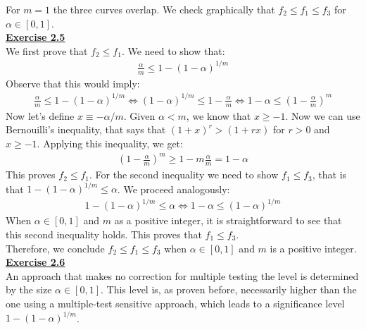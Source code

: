 \documentclass[a4paper, 11pt]{article}
\begin{document}
For $m=1$ the three curves overlap. We check graphically that $f_2 \leq f_1 \leq f_3$ for $\alpha \in [0,1]$.\\
\newline \textbf{\underline{Exercise 2.5}}\\
\newline We first prove that $f_2 \leq f_1$. We need to show that:
\begin{eqnarray}
\frac{\alpha}{m} \leq 1 - (1 - \alpha)^{1/m} \nonumber
\end{eqnarray}
Observe that this would imply:
\begin{eqnarray}
\frac{\alpha}{m} \leq 1 - (1 - \alpha)^{1/m} \Leftrightarrow  (1 - \alpha)^{1/m} \leq 1 - \frac{\alpha}{m} \Leftrightarrow 1 - \alpha \leq \left( 1 - \frac{\alpha}{m} \right)^{m} \nonumber
\end{eqnarray}
Now let's define $x \equiv -\alpha / m$. Given $\alpha < m$, we know that $x \geq -1$. Now we can use Bernouilli's inequality, that says that $(1+x)^r > (1+rx)$ for $r>0$ and $x \geq -1$. Applying this inequality, we get:
\begin{eqnarray}
\left( 1 - \frac{\alpha}{m} \right)^{m} \geq 1 - m \frac{\alpha}{m} = 1 - \alpha \nonumber
\end{eqnarray}
This proves $f_2 \leq f_1$. For the second inequality we need to show $f_1 \leq f_3$, that is that $1 - (1 - \alpha)^{1/m} \leq \alpha$. We proceed analogously:
\begin{eqnarray}
1 - (1 - \alpha)^{1/m} \leq \alpha \Leftrightarrow  1 - \alpha \leq (1 - \alpha)^{1/m} \nonumber
\end{eqnarray}
When $\alpha \in [0,1]$ and $m$ as a positive integer, it is straightforward to see that this second inequality holds. This proves that $f_1 \leq f_3$.\\
\newline Therefore, we conclude $f_2 \leq f_1 \leq f_3$ when $\alpha \in [0,1]$ and $m$ is a positive integer.\\
\newline \textbf{\underline{Exercise 2.6}}\\
\newline An approach that makes no correction for multiple testing the level is determined by the size $\alpha \in [0,1]$. This level is, as proven before, necessarily higher than the one using a multiple-test sensitive approach, which leads to a significance level $1 - (1- \alpha)^{1/m}$.\\
\end{document}
